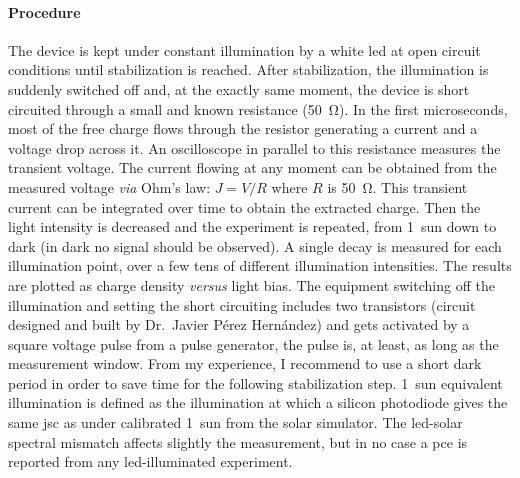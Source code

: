 	\paragraph{Procedure}
	The device is kept under constant illumination by a white \gls{led} at open circuit conditions until stabilization is reached.
	After stabilization, the illumination is suddenly switched off and, at the exactly same moment, the device is short circuited through a small and known resistance (\SI{50}{\ohm}).
	In the first microseconds, most of the free charge flows through the resistor generating a current and a voltage drop across it.
	An oscilloscope in parallel to this resistance measures the transient voltage.
	The current flowing at any moment can be obtained from the measured voltage \textsl{via} Ohm's law: $J=V/R$ where $R$ is \SI{50}{\ohm}.
	This transient current can be integrated over time to obtain the extracted charge.
	Then the light intensity is decreased and the experiment is repeated, from 1~sun down to dark (in dark no signal should be observed).
	A single decay is measured for each illumination point, over a few tens of different illumination intensities.
	The results are plotted as charge density \textsl{versus} light bias.
	The equipment switching off the illumination and setting the short circuiting includes two transistors (circuit designed and built by Dr.\ Javier Pérez Hernández) and gets activated by a square voltage pulse from a pulse generator, the pulse is, at least, as long as the measurement window.
	From my experience, I recommend to use a short dark period in order to save time for the following stabilization step.
	1~sun equivalent illumination is defined as the illumination at which a silicon photodiode gives the same \gls{jsc} as under calibrated 1~sun from the solar simulator.
	The \gls{led}-solar spectral mismatch affects slightly the measurement, but in no case a \gls{pce} is reported from any \gls{led}-illuminated experiment.

